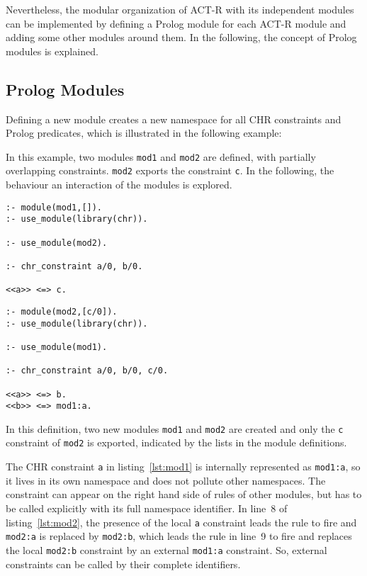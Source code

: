 Nevertheless, the modular organization of ACT-R with its independent modules can be implemented by defining a Prolog module for each ACT-R module and adding some other modules around them. In the following, the concept of Prolog modules is explained.

\subsection{Prolog Modules}

Defining a new module creates a new namespace for all CHR constraints and Prolog predicates, which is illustrated in the following example:

\begin{example}

In this example, two modules \lstinline|mod1| and \lstinline|mod2| are defined, with partially overlapping constraints. \lstinline|mod2| exports the constraint \lstinline|c|. In the following, the behaviour an interaction of the modules is explored.

\begin{lstlisting}[caption={Definition of Module 1},label=lst:mod1]
:- module(mod1,[]).
:- use_module(library(chr)).

:- use_module(mod2).

:- chr_constraint a/0, b/0.

<<a>> <=> c.
\end{lstlisting}

\begin{lstlisting}[caption={Definition of Module 2},label=lst:mod2]
:- module(mod2,[c/0]).
:- use_module(library(chr)).

:- use_module(mod1).

:- chr_constraint a/0, b/0, c/0. 

<<a>> <=> b.
<<b>> <=> mod1:a.
\end{lstlisting}


In this definition, two new modules \lstinline|mod1| and \lstinline|mod2| are created and only the \lstinline|c| constraint of \lstinline|mod2| is exported, indicated by the lists in the module definitions.

The CHR constraint \lstinline|a| in listing~\ref{lst:mod1} is internally represented as \lstinline|mod1:a|, so it lives in its own namespace and does not pollute other namespaces. The constraint can appear on the right hand side of rules of other modules, but has to be called explicitly with its full namespace identifier. In line~8 of listing~\ref{lst:mod2}, the presence of the local \lstinline|a| constraint leads the rule to fire and \lstinline|mod2:a| is replaced by \lstinline|mod2:b|, which leads the rule in line~9 to fire and replaces the local \lstinline|mod2:b| constraint by an external \lstinline|mod1:a| constraint. So, external constraints can be called by their complete identifiers.


\end{example}
